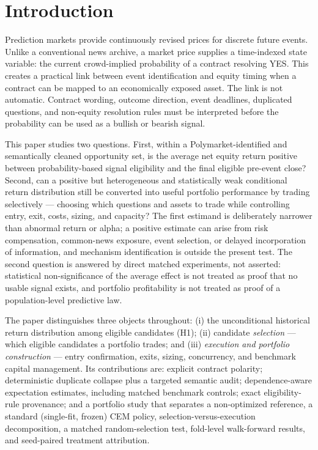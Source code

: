 \documentclass[sigconf,anonymous]{acmart}
\begin{document}

\maketitle

\section{Introduction}

Prediction markets provide continuously revised prices for discrete future events. Unlike a conventional news archive, a market price supplies a time-indexed state variable: the current crowd-implied probability of a contract resolving YES. This creates a practical link between event identification and equity timing when a contract can be mapped to an economically exposed asset. The link is not automatic. Contract wording, outcome direction, event deadlines, duplicated questions, and non-equity resolution rules must be interpreted before the probability can be used as a bullish or bearish signal.

This paper studies two questions. First, within a Polymarket-identified and semantically cleaned opportunity set, is the average net equity return positive between probability-based signal eligibility and the final eligible pre-event close? Second, can a positive but heterogeneous and statistically weak conditional return distribution still be converted into useful portfolio performance by trading selectively --- choosing which questions and assets to trade while controlling entry, exit, costs, sizing, and capacity? The first estimand is deliberately narrower than abnormal return or alpha; a positive estimate can arise from risk compensation, common-news exposure, event selection, or delayed incorporation of information, and mechanism identification is outside the present test. The second question is answered by direct matched experiments, not asserted: statistical non-significance of the average effect is not treated as proof that no usable signal exists, and portfolio profitability is not treated as proof of a population-level predictive law.

The paper distinguishes three objects throughout: (i) the unconditional historical return distribution among eligible candidates (H1); (ii) candidate \emph{selection} --- which eligible candidates a portfolio trades; and (iii) \emph{execution and portfolio construction} --- entry confirmation, exits, sizing, concurrency, and benchmark capital management. Its contributions are: explicit contract polarity; deterministic duplicate collapse plus a targeted semantic audit; dependence-aware expectation estimates, including matched benchmark controls; exact eligibility-rule provenance; and a portfolio study that separates a non-optimized reference, a standard (single-fit, frozen) CEM policy, selection-versus-execution decomposition, a matched random-selection test, fold-level walk-forward results, and seed-paired treatment attribution.
\end{document}
